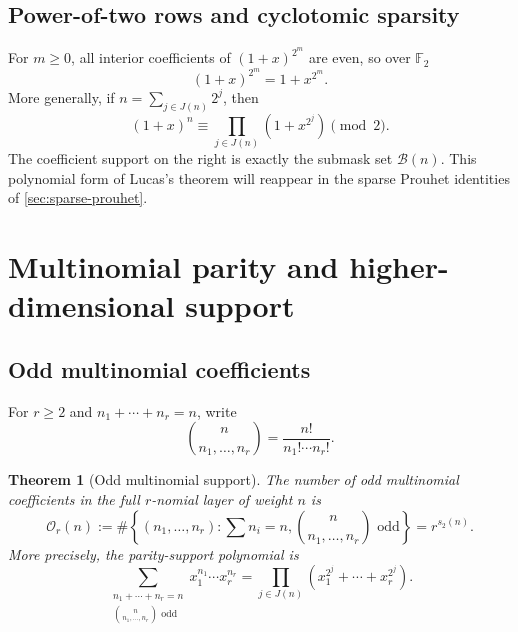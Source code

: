 \documentclass[11pt,oneside]{article}
\newtheorem{theorem}{Theorem}[section]
\theoremstyle{definition}
\theoremstyle{remark}
\newcommand{\Ftwo}{\mathbb F_2}
\newcommand{\bitsum}{s_2}
\begin{document}
\subsection{Power-of-two rows and cyclotomic sparsity}

For $m\ge0$, all interior coefficients of $(1+x)^{2^m}$ are even, so over
$\Ftwo$
\begin{equation}\label{eq:freshman-dream}
 (1+x)^{2^m}=1+x^{2^m}.
\end{equation}
More generally, if $n=\sum_{j\in J(n)}2^j$, then
\begin{equation}\label{eq:lucas-polynomial}
 (1+x)^n
 \equiv\prod_{j\in J(n)}(1+x^{2^j})
 \pmod2.
\end{equation}
The coefficient support on the right is exactly the submask set
$\mathcal B(n)$.  This polynomial form of Lucas's theorem will reappear in the
sparse Prouhet identities of \cref{sec:sparse-prouhet}.

\section{Multinomial parity and higher-dimensional support}

\subsection{Odd multinomial coefficients}

For $r\ge2$ and $n_1+\cdots+n_r=n$, write
\[
 \binom{n}{n_1,\ldots,n_r}=\frac{n!}{n_1!\cdots n_r!}.
\]

\begin{theorem}[Odd multinomial support]\label{thm:odd-multinomial}
The number of odd multinomial coefficients in the full $r$-nomial layer of
weight $n$ is
\begin{equation}\label{eq:odd-multinomial-count}
 \mathcal O_r(n)
 :=\#\left\{(n_1,\ldots,n_r):\sum n_i=n,
       \binom{n}{n_1,\ldots,n_r}\text{ odd}\right\}
 =r^{\bitsum(n)}.
\end{equation}
More precisely, the parity-support polynomial is
\begin{equation}\label{eq:multinomial-support-polynomial}
 \sum_{\substack{n_1+\cdots+n_r=n\\
       \binom{n}{n_1,\ldots,n_r}\text{ odd}}}
 x_1^{n_1}\cdots x_r^{n_r}
 =\prod_{j\in J(n)}
   \left(x_1^{2^j}+\cdots+x_r^{2^j}\right).
\end{equation}
\end{theorem}
\end{document}
